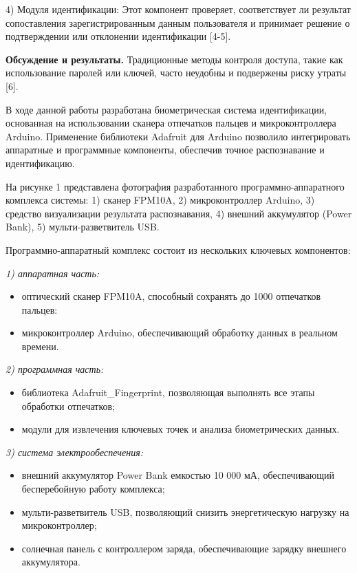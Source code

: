 \begin{multicols}{2}
4) Модуля идентификации: Этот компонент проверяет, соответствует ли
результат сопоставления зарегистрированным данным пользователя и
принимает решение о подтверждении или отклонении идентификации
{[}4-5{]}.

{\bfseries Обсуждение и результаты.} Традиционные методы контроля доступа,
такие как использование паролей или ключей, часто неудобны и подвержены
риску утраты {[}6{]}.

В ходе данной работы разработана биометрическая система идентификации,
основанная на использовании сканера отпечатков пальцев и
микроконтроллера Arduino. Применение библиотеки Adafruit для Arduino
позволило интегрировать аппаратные и программные компоненты, обеспечив
точное распознавание и идентификацию.

На рисунке 1 представлена фотография разработанного
программно-аппаратного комплекса системы: 1) сканер FPM10A, 2)
микроконтроллер Arduino, 3) средство визуализации результата
распознавания, 4) внешний аккумулятор (Power Bank), 5)
мульти-разветвитель USB.

Программно-аппаратный комплекс состоит из нескольких ключевых
компонентов:

\emph{1) аппаратная часть:}

\begin{itemize}
\item
  оптический сканер FPM10A, способный сохранять до 1000 отпечатков
  пальцев:
\item
  микроконтроллер Arduino, обеспечивающий обработку данных в реальном
  времени.
\end{itemize}

\emph{2) программная часть:}

\begin{itemize}
\item
  библиотека Adafruit\_Fingerprint, позволяющая выполнять все этапы
  обработки отпечатков;
\item
  модули для извлечения ключевых точек и анализа биометрических данных.
\end{itemize}

\emph{3) система электрообеспечения:}

\begin{itemize}
\item
  внешний аккумулятор Power Bank емкостью 10 000 мА, обеспечивающий
  бесперебойную работу комплекса;
\item
  мульти-разветвитель USB, позволяющий снизить энергетическую нагрузку
  на микроконтроллер;
\item
  солнечная панель с контроллером заряда, обеспечивающие зарядку
  внешнего аккумулятора.
\end{itemize}
\end{multicols}


